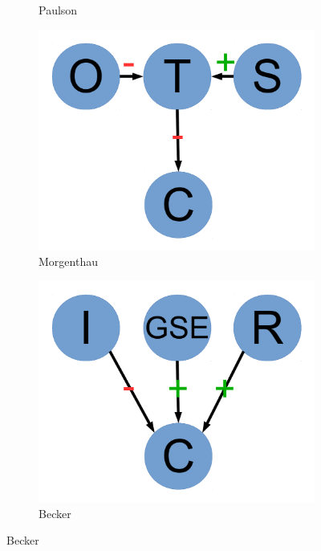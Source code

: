 \documentclass[11pt]{article}
\begin{document}
\begin{figure}
\begin{subfigure}[b]{0.2\textwidth}
                \caption{\footnotesize Paulson}
                \label{fig:paulson}
        \end{subfigure}
        \begin{subfigure}[b]{0.2\textwidth}
                \includegraphics[width=\textwidth]{morgenthau.pdf}
                \caption{\footnotesize Morgenthau}
                \label{fig:morgenthau}
        \end{subfigure}
        \begin{subfigure}[b]{0.2\textwidth}
                \includegraphics[width=\textwidth]{becker.pdf}
                \caption{\footnotesize Becker}

\end{subfigure}
\end{figure}
\end{document}
